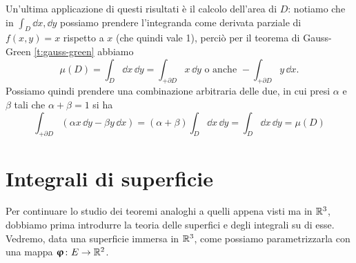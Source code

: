 Un'ultima applicazione di questi risultati è il calcolo dell'area di $D$: notiamo che in $\int_D\dd x,\dd y$ possiamo prendere l'integranda come derivata parziale di $f(x,y)=x$ rispetto a $x$ (che quindi vale 1), perciò per il teorema di Gauss-Green \ref{t:gauss-green} abbiamo
\begin{equation}
	\mu(D)=\int_D\dd x\,\dd y=\int_{+\partial D}x\,\dd y\text{ o anche }-\int_{+\partial D}y\,\dd x.
\end{equation}
Possiamo quindi prendere una combinazione arbitraria delle due, in cui presi $\alpha$ e $\beta$ tali che $\alpha+\beta=1$ si ha
\begin{equation}
	\int_{+\partial D}(\alpha x\,\dd y-\beta y\,\dd x)=(\alpha+\beta)\int_D\dd x\,\dd y=\int_D\dd x\,\dd y=\mu(D)
\end{equation}

\section{Integrali di superficie}
Per continuare lo studio dei teoremi analoghi a quelli appena visti ma in $\mathbb{R}^3$, dobbiamo prima introdurre la teoria delle superfici e degli integrali su di esse.
Vedremo, data una superficie immersa in $\mathbb{R}^3$, come possiamo parametrizzarla con una mappa $\bm{\upvarphi}\colon E\to\mathbb{R}^2$.

